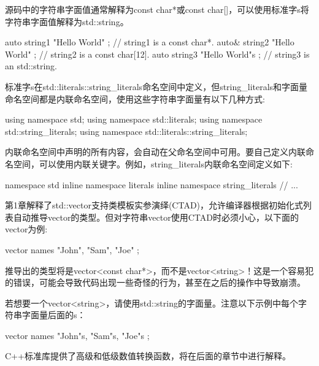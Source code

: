 源码中的字符串字面值通常解释为const char*或const char[]，可以使用标准字s将字符串字面值解释为std::string。

\begin{cpp}
auto string1 { "Hello World" }; // string1 is a const char*.
auto& string2 { "Hello World" }; // string2 is a const char[12].
auto string3 { "Hello World"s }; // string3 is an std::string.
\end{cpp}

标准字s在std::literals::string\_literals命名空间中定义，但string\_literals和字面量命名空间都是内联命名空间，使用这些字符串字面量有以下几种方式:

\begin{cpp}
using namespace std;
using namespace std::literals;
using namespace std::string_literals;
using namespace std::literals::string_literals;
\end{cpp}

内联命名空间中声明的所有内容，会自动在父命名空间中可用。要自己定义内联命名空间，可以使用内联关键字。例如，string\_literals内联命名空间定义如下:

\begin{cpp}
namespace std {
    inline namespace literals {
        inline namespace string_literals {
            // ...
        }
    }
}
\end{cpp}


第1章解释了std::vector支持类模板实参演绎(CTAD)，允许编译器根据初始化式列表自动推导vector的类型。但对字符串vector使用CTAD时必须小心，以下面的vector为例:

\begin{cpp}
vector names { "John", "Sam", "Joe" };
\end{cpp}

推导出的类型将是vector<const char*>，而不是vector<string>！这是一个容易犯的错误，可能会导致代码出现一些奇怪的行为，甚至在之后的操作中导致崩溃。

若想要一个vector<string>，请使用std::string的字面量。注意以下示例中每个字符串字面量后面的s：

\begin{cpp}
vector names { "John"s, "Sam"s, "Joe"s };
\end{cpp}


C++标准库提供了高级和低级数值转换函数，将在后面的章节中进行解释。


